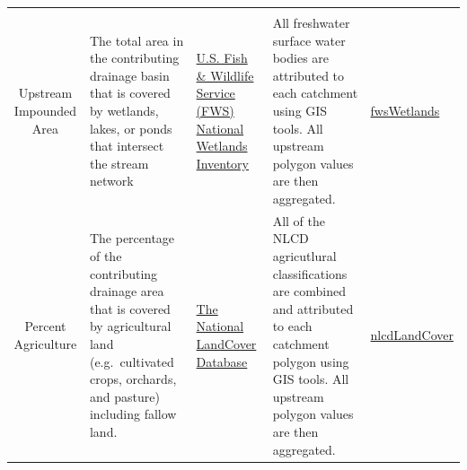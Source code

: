 \documentclass[]{article}
\begin{document}
\begin{longtable}[c]{@{}cllll@{}}
\begin{minipage}[t]{0.16\columnwidth}
\strut\end{minipage}\tabularnewline
\begin{minipage}[t]{0.10\columnwidth}\centering\strut
Upstream Impounded Area
\strut\end{minipage} &
\begin{minipage}[t]{0.24\columnwidth}\raggedright\strut
The total area in the contributing drainage basin that is covered by
wetlands, lakes, or ponds that intersect the stream network
\strut\end{minipage} &
\begin{minipage}[t]{0.14\columnwidth}\raggedright\strut
\href{http://www.fws.gov/wetlands/Data/Data-Download.html}{U.S. Fish \&
Wildlife Service (FWS) National Wetlands Inventory}
\strut\end{minipage} &
\begin{minipage}[t]{0.23\columnwidth}\raggedright\strut
All freshwater surface water bodies are attributed to each catchment
using GIS tools. All upstream polygon values are then aggregated.
\strut\end{minipage} &
\begin{minipage}[t]{0.16\columnwidth}\raggedright\strut
\href{https://github.com/Conte-Ecology/shedsData/tree/master/basinCharacteristics/rasterPrep/fwsWetlands}{fwsWetlands}
\strut\end{minipage}\tabularnewline
\begin{minipage}[t]{0.10\columnwidth}\centering\strut
Percent Agriculture
\strut\end{minipage} &
\begin{minipage}[t]{0.24\columnwidth}\raggedright\strut
The percentage of the contributing drainage area that is covered by
agricultural land (e.g.~cultivated crops, orchards, and pasture)
including fallow land.
\strut\end{minipage} &
\begin{minipage}[t]{0.14\columnwidth}\raggedright\strut
\href{http://www.mrlc.gov/nlcd06_data.php}{The National LandCover
Database}
\strut\end{minipage} &
\begin{minipage}[t]{0.23\columnwidth}\raggedright\strut
All of the NLCD agricutlural classifications are combined and attributed
to each catchment polygon using GIS tools. All upstream polygon values
are then aggregated.
\strut\end{minipage} &
\begin{minipage}[t]{0.16\columnwidth}\raggedright\strut
\href{https://github.com/Conte-Ecology/shedsData/tree/master/basinCharacteristics/rasterPrep/nlcdLandCover}{nlcdLandCover}

\end{minipage}
\end{longtable}
\end{document}
